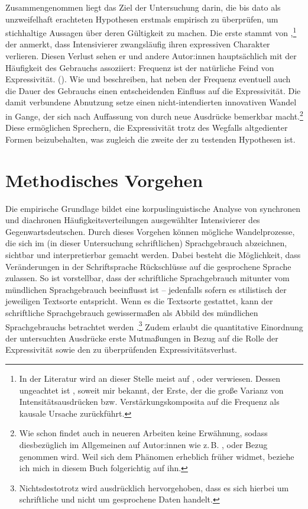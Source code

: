 \largerpage
Zusammengenommen liegt das Ziel der Untersuchung darin, die bis dato als unzweifelhaft erachteten Hypothesen erstmals empirisch zu überprüfen, um stichhaltige Aussagen über deren Gültigkeit zu machen. Die erste stammt von \citet[2]{Hauschild.1899},\footnote{In der Literatur wird an dieser Stelle meist auf \citet[126f.]{Biedermann.1969}, \citet[99]{Suscinskij.1985} oder \citet[2]{Keller.2003} verwiesen. Dessen ungeachtet ist \citet[2]{Hauschild.1899}, soweit mir bekannt, der Erste, der die große Varianz von Intensitätsausdrücken bzw. Verstärkungskomposita auf die Frequenz als kausale Ursache zurückführt.} der anmerkt, dass Intensivierer zwangsläufig ihren expressiven Charakter verlieren. Diesen Verlust sehen er und andere Autor:innen hauptsächlich mit der Häufigkeit des Gebrauchs assoziiert: \glqq{}Frequenz ist der natürliche Feind von Expressivität.\grqq{} (\citealt[2]{Keller.2003}). Wie \citet[59]{Tobler.1868} und \citet[253]{Gabelentz.2016} beschreiben, hat neben der Frequenz eventuell auch die Dauer des Gebrauchs einen entscheidenden Einfluss auf die Expressivität. Die damit verbundene Abnutzung setze einen nicht-intendierten innovativen Wandel in Gange, der sich nach Auffassung von \citet[274]{Baumgarten.1908} durch neue Ausdrücke bemerkbar macht.\footnote{Wie schon \citet[]{Hauschild.1899} findet auch \citet[]{Baumgarten.1908} in neueren Arbeiten keine Erwähnung, sodass diesbezüglich im Allgemeinen auf Autor:innen wie z.\,B. \citet[18]{Bolinger.1972}, \citet[99]{Suscinskij.1985} oder \citet[391]{Tagliamonte.2008} Bezug genommen wird. Weil \citet[274]{Baumgarten.1908} sich dem Phänomen erheblich früher widmet, beziehe ich mich in diesem Buch folgerichtig auf ihn.} Diese ermöglichen Sprechern, die Expressivität trotz des Wegfalls altgedienter Formen beizubehalten, was zugleich die zweite der zu testenden Hypothesen ist.

\section{Methodisches Vorgehen} \label{Durchführung}

Die empirische Grundlage bildet eine korpuslinguistische Analyse von synchronen und diachronen Häufigkeitsverteilungen ausgewählter Intensivierer des Gegenwartsdeutschen. Durch dieses Vorgehen können mögliche Wandelprozesse, die sich im (in dieser Untersuchung schriftlichen) Sprachgebrauch abzeichnen, sichtbar und interpretierbar gemacht werden. Dabei besteht die Möglichkeit, dass Veränderungen in der Schriftsprache Rückschlüsse auf die gesprochene Sprache zulassen. So ist vorstellbar, dass der schriftliche Sprachgebrauch mitunter vom mündlichen Sprachgebrauch beeinflusst ist -- jedenfalls sofern es stilistisch der jeweiligen Textsorte entspricht. Wenn es die Textsorte gestattet, kann der schriftliche Sprachgebrauch gewissermaßen als Abbild des mündlichen Sprachgebrauchs betrachtet werden \citep[vgl.][]{Koch.1996,Koch.2007}.\footnote{Nichtsdestotrotz wird ausdrücklich hervorgehoben, dass es sich hierbei um schriftliche und nicht um gesprochene Daten handelt.} Zudem erlaubt die quantitative Einordnung der untersuchten Ausdrücke erste Mutmaßungen in Bezug auf die Rolle der Expressivität sowie den zu überprüfenden Expressivitätsverlust.

